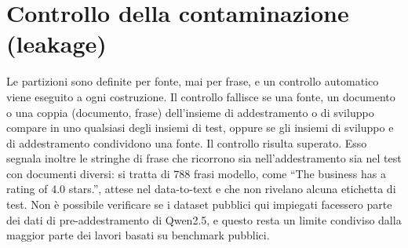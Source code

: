 \section{Controllo della contaminazione (leakage)}
\label{sec:data-leakage}

Le partizioni sono definite per fonte, mai per frase, e un controllo automatico viene eseguito a ogni costruzione. Il
controllo fallisce se una fonte, un documento o una coppia (documento, frase) dell'insieme di addestramento o di
sviluppo compare in uno qualsiasi degli insiemi di test, oppure se gli insiemi di sviluppo e di addestramento
condividono una fonte. Il controllo risulta superato. Esso segnala inoltre le stringhe di frase che ricorrono sia
nell'addestramento sia nel test con documenti diversi: si tratta di 788 frasi modello, come ``The business has a rating
of 4.0 stars.'', attese nel data-to-text e che non rivelano alcuna etichetta di test. Non è possibile verificare se i
dataset pubblici qui impiegati facessero parte dei dati di pre-addestramento di Qwen2.5, e questo resta un limite
condiviso dalla maggior parte dei lavori basati su benchmark pubblici.
